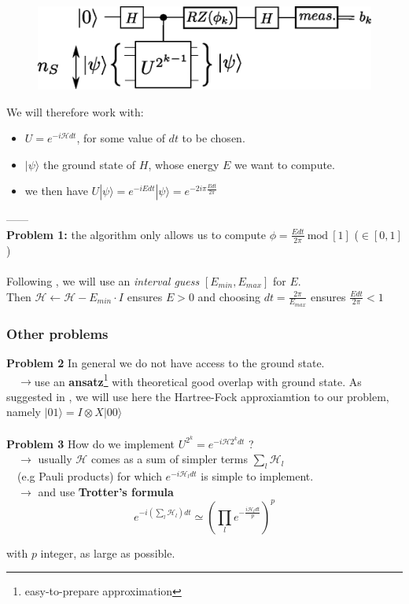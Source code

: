 \documentclass{beamer}
\begin{document}
\begin{frame}

\begin{center}
\begin{figure}
\includegraphics[width=.6\textwidth]{iterative_pea.eps}
\end{figure}
\end{center}

We will therefore work with:
\begin{itemize} 
\item $U=e^{-i\mathcal{H}dt}$, for some value of $dt$ to be chosen.
\item $|\psi\rangle$ the ground state of $H$, whose energy $E$ we want to compute.
\item we then have $U|\psi\rangle = e^{-iEdt}|\psi\rangle= e^{-2i\pi\frac{Edt}{2\pi}}$
\end{itemize}
------\\
\textbf{Problem 1:} the algorithm only allows us to compute $\phi=\frac{Edt}{2\pi}\: \text{mod}\: \left[1\right]$ ($\in \left[0,1\right]$)\\~\\
Following \textcolor{blue}{\cite{whitfield2011simulation}}, we will use an \emph{interval guess} $\left[E_{min},E_{max}\right]$ 
for $E$.\\
Then $\mathcal{H}\leftarrow \mathcal{H}-E_{min}\cdot I$ ensures $E>0$ and choosing $dt=\frac{2\pi}{E_{max}}$ ensures $\frac{Edt}{2\pi}<1$ 

\end{frame}

\begin{frame}
\frametitle{Other problems}
\textbf{Problem 2} In general we do not have access to the ground state.\\$\quad\rightarrow$use an \textbf{ansatz}\footnote{easy-to-prepare approximation} 
with theoretical good overlap with ground state. As suggested in \textcolor{blue}{\cite{o2016scalable}}, we will
use here the Hartree-Fock approxiamtion to our problem, namely $|01\rangle=I\otimes X |00\rangle$\\~\\

\textbf{Problem 3} How do we implement $U^{2^{k}} = e^{-i\mathcal{H}2^{k}dt}$ ?\\
$\quad\rightarrow$ usually $\mathcal{H}$ comes as a sum of simpler terms $\sum_{l} \mathcal{H}_{l}$\\
$\quad$(e.g Pauli products) for which $e^{-i\mathcal{H}_{l}dt}$ is simple to implement.\\
$\quad\rightarrow$ and use \textbf{Trotter's formula} \textcolor{blue}{\cite{whitfield2011simulation}} 
$$ e^{-i\left(\sum_{l}\mathcal{H}_{l}\right)dt} \simeq \left(\prod_{l} e^{-\frac{i\mathcal{H}_{l}dt}{p} }\right)^{p} $$ 

with $p$ integer, as large as possible.

\end{frame}
\end{document}
